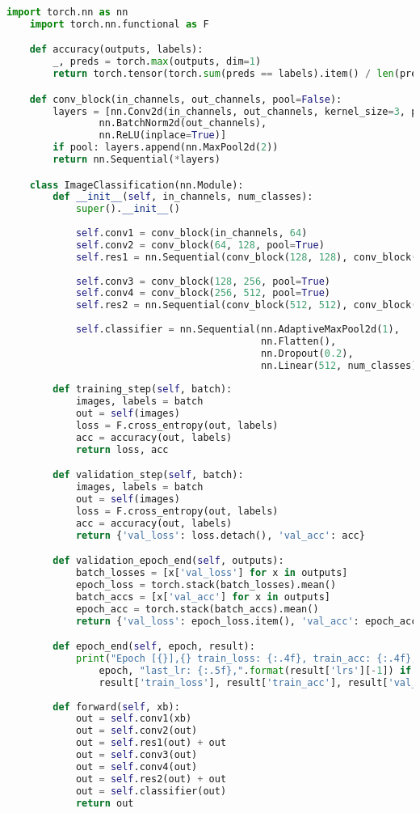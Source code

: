\documentclass[11pt]{article}
\begin{document}
	\begin{lstlisting}[language=Python, caption={Implementacja sieci},captionpos=b]
	import torch.nn as nn
	import torch.nn.functional as F

	def accuracy(outputs, labels):
		_, preds = torch.max(outputs, dim=1)
		return torch.tensor(torch.sum(preds == labels).item() / len(preds))

	def conv_block(in_channels, out_channels, pool=False):
		layers = [nn.Conv2d(in_channels, out_channels, kernel_size=3, padding=1), 
				nn.BatchNorm2d(out_channels), 
				nn.ReLU(inplace=True)]
		if pool: layers.append(nn.MaxPool2d(2))
		return nn.Sequential(*layers)

	class ImageClassification(nn.Module):
		def __init__(self, in_channels, num_classes):
			super().__init__()
			
			self.conv1 = conv_block(in_channels, 64)
			self.conv2 = conv_block(64, 128, pool=True)   
			self.res1 = nn.Sequential(conv_block(128, 128), conv_block(128, 128))
			
			self.conv3 = conv_block(128, 256, pool=True)
			self.conv4 = conv_block(256, 512, pool=True)    
			self.res2 = nn.Sequential(conv_block(512, 512), conv_block(512, 512))   
			
			self.classifier = nn.Sequential(nn.AdaptiveMaxPool2d(1),
											nn.Flatten(),     
											nn.Dropout(0.2),
											nn.Linear(512, num_classes))    
			
		def training_step(self, batch):
        	images, labels = batch
        	out = self(images)
        	loss = F.cross_entropy(out, labels)
        	acc = accuracy(out, labels)
        	return loss, acc

		def validation_step(self, batch):
			images, labels = batch
			out = self(images)
			loss = F.cross_entropy(out, labels)
			acc = accuracy(out, labels)
			return {'val_loss': loss.detach(), 'val_acc': acc}

		def validation_epoch_end(self, outputs):
			batch_losses = [x['val_loss'] for x in outputs]
			epoch_loss = torch.stack(batch_losses).mean()
			batch_accs = [x['val_acc'] for x in outputs]
			epoch_acc = torch.stack(batch_accs).mean()
			return {'val_loss': epoch_loss.item(), 'val_acc': epoch_acc.item()}

		def epoch_end(self, epoch, result):
			print("Epoch [{}],{} train_loss: {:.4f}, train_acc: {:.4f}, val_loss: {:.4f}, val_acc: {:.4f}".format(
				epoch, "last_lr: {:.5f},".format(result['lrs'][-1]) if 'lrs' in result else '', 
				result['train_loss'], result['train_acc'], result['val_loss'], result['val_acc']))
			
		def forward(self, xb):
			out = self.conv1(xb)
			out = self.conv2(out)
			out = self.res1(out) + out
			out = self.conv3(out)
			out = self.conv4(out)
			out = self.res2(out) + out
			out = self.classifier(out)
			return out
	\end{lstlisting}
\end{document}

